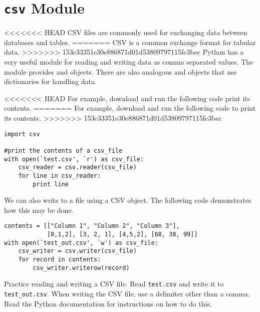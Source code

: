 \section*{\texttt{csv} Module}
<<<<<<< HEAD
CSV files are commonly used for exchanging data between databases and tables. 
=======
CSV is a common exchange format for tabular data.
>>>>>>> 153c33351e30e886871d01d53809797115fc3bec
Python has a very useful module for reading and writing data as comma separated values.
The  module provides  and  objects.
There are also analogous  and  objects that use dictionaries for handling data.

<<<<<<< HEAD
For example, download  and run the following code print its contents.
=======
For example, download  and run the following code to print its contents.
>>>>>>> 153c33351e30e886871d01d53809797115fc3bec
\begin{lstlisting}
import csv

#print the contents of a csv_file
with open(`test.csv', `r') as csv_file:
    csv_reader = csv.reader(csv_file)
    for line in csv_reader:
        print line
\end{lstlisting}

We can also write to a  file using a CSV  object.  The following code demonstrates how this may be done.

\begin{lstlisting}
contents = [["Column 1", "Column 2", "Column 3"],
            [0,1,2], [3, 2, 1], [4,5,2], [68, 38, 99]]
with open(`test_out.csv', `w') as csv_file:
    csv_writer = csv.writer(csv_file)
    for record in contents:
        csv_writer.writerow(record)
\end{lstlisting}

\begin{problem}
Practice reading and writing a CSV file.
Read \texttt{test.csv} and write it to \texttt{test\_out.csv}.
When writing the CSV file, use a delimiter other than a comma.
Read the Python documentation for instructions on how to do this.
\end{problem}

